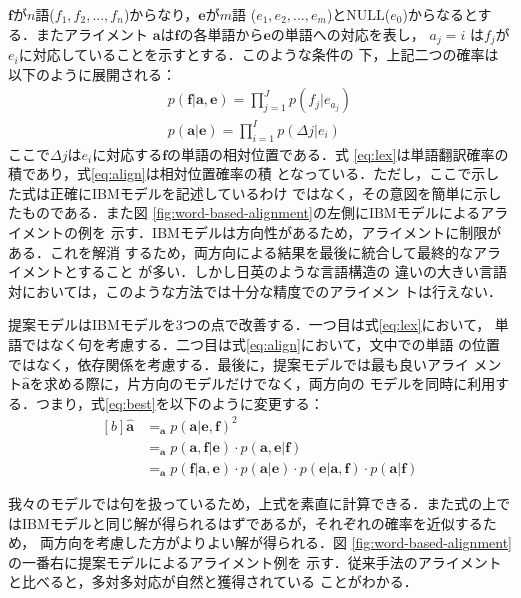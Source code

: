 \documentclass[japanese]{jnlp_1.4}
\newcommand{\argmax}{}
\begin{document}
$\mathbf{f}$が$n$語($f_1,f_2,...,f_n$)からなり，$\mathbf{e}$が$m$語
($e_1,e_2,...,e_m$)とNULL($e_0$)からなるとする．またアライメント
$\mathbf{a}$は$\mathbf{f}$の各単語から$\mathbf{e}$の単語への対応を表し，
$a_j = i$ は$f_j$が$e_i$に対応していることを示すとする．このような条件の
下，上記二つの確率は以下のように展開される：
{\allowdisplaybreaks
\begin{gather}
 p(\mathbf{f}|\mathbf{a}, \mathbf{e}) = \prod_{j=1}^{J} p(f_j|e_{a_j}) 
 \label{eq:lex} \\
 p(\mathbf{a}|\mathbf{e}) = \prod_{i=1}^{I} p(\Delta j|e_i)
 \label{eq:align}
\end{gather}
}
ここで$\Delta j$は$e_i$に対応する$\mathbf{f}$の単語の相対位置である．式
\ref{eq:lex}は単語翻訳確率の積であり，式\ref{eq:align}は相対位置確率の積
となっている．ただし，ここで示した式は正確にIBMモデルを記述しているわけ
ではなく，その意図を簡単に示したものである．また図
\ref{fig:word-based-alignment}の左側にIBMモデルによるアライメントの例を
示す．IBMモデルは方向性があるため，アライメントに制限がある．これを解消
するため，両方向による結果を最後に統合して最終的なアライメントとすること
が多い\cite{koehn-och-marcu:2003:HLTNAACL}．しかし日英のような言語構造の
違いの大きい言語対においては，このような方法では十分な精度でのアライメン
トは行えない．

提案モデルはIBMモデルを3つの点で改善する．一つ目は式\ref{eq:lex}において，
単語ではなく句を考慮する．二つ目は式\ref{eq:align}において，文中での単語
の位置ではなく，依存関係を考慮する．最後に，提案モデルでは最も良いアライ
メント$\hat{\mathbf{a}}$を求める際に，片方向のモデルだけでなく，両方向の
モデルを同時に利用する．つまり，式\ref{eq:best}を以下のように変更する：
\begin{equation}
 \label{eq:best_proposed}
\begin{aligned}[b]
  \hat{\mathbf{a}} & = \argmax_{\mathbf{a}} p(\mathbf{a} | \mathbf{e}, \mathbf{f})^2 \\
     & = \argmax_{\mathbf{a}} p(\mathbf{a}, \mathbf{f} | \mathbf{e}) \cdot p(\mathbf{a}, \mathbf{e} | \mathbf{f})\\
     & = \argmax_{\mathbf{a}} p(\mathbf{f}|\mathbf{a}, \mathbf{e}) \cdot p(\mathbf{a}|\mathbf{e}) \cdot p(\mathbf{e}|\mathbf{a}, \mathbf{f}) \cdot p(\mathbf{a}|\mathbf{f})
\end{aligned}
\end{equation}


我々のモデルでは句を扱っているため，上式を素直に計算できる．また式の上で
はIBMモデルと同じ解が得られるはずであるが，それぞれの確率を近似するため，
両方向を考慮した方がよりよい解が得られる．図
\ref{fig:word-based-alignment}の一番右に提案モデルによるアライメント例を
示す．従来手法のアライメントと比べると，多対多対応が自然と獲得されている
ことがわかる．
\end{document}
